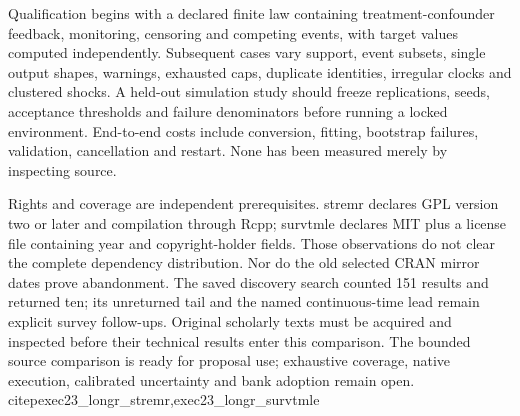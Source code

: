 Qualification begins with a declared finite law containing treatment-confounder
feedback, monitoring, censoring and competing events, with target values
computed independently. Subsequent cases vary support, event subsets, single
output shapes, warnings, exhausted caps, duplicate identities, irregular
clocks and clustered shocks. A held-out simulation study should freeze
replications, seeds, acceptance thresholds and failure denominators before
running a locked environment. End-to-end costs include conversion, fitting,
bootstrap failures, validation, cancellation and restart. None has been
measured merely by inspecting source.

Rights and coverage are independent prerequisites. stremr declares GPL version
two or later and compilation through Rcpp; survtmle declares MIT plus a license
file containing year and copyright-holder fields. Those observations do not
clear the complete dependency distribution. Nor do the old selected CRAN
mirror dates prove abandonment. The saved discovery search counted 151 results
and returned ten; its unreturned tail and the named continuous-time lead
remain explicit survey follow-ups. Original scholarly texts must be acquired
and inspected before their technical results enter this comparison.
The bounded source comparison is ready for proposal use; exhaustive coverage,
native execution, calibrated uncertainty and bank adoption remain open.
citep{exec23_longr_stremr,exec23_longr_survtmle}
